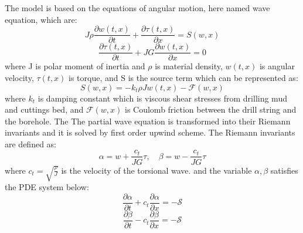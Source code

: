 The model is based on the equations of angular motion, here named wave equation, which are:
\begin{equation}\label{AS-motion}
  J\rho\frac{\partial w(t,x)}{\partial t} + \frac{\partial \tau (t,x)}{\partial x} = S(w,x) 
\end{equation}
\begin{equation}
 \frac{\partial\tau(t,x)}{\partial t} + JG\frac{\partial w(t,x)}{\partial x} = 0 
\end{equation}
where J is polar moment of inertia and $\rho$ is material density, $w(t,x)$ is angular velocity, $\tau(t,x)$ is torque, and S is the source term which can be represented as:
\begin{equation}\label{AS-sourceterm}
  S(w,x) = -k_t \rho J w(t,x) - \mathcal{F}(w,x)
\end{equation}
where $k_t$ is damping constant which is viscous shear stresses from drilling mud and cuttings bed, and $\mathcal{F}(w,x)$ is Coulomb friction between the drill string and the borehole. 
The 
The partial wave equation is transformed into their Riemann invariants and it is solved by first order upwind scheme. The Riemann invariants are defined as:
\begin{equation}\label{AS-Riemann}
  \alpha = w + \frac{c_t}{JG}\tau, \quad \beta=w-\frac{c_t}{JG}\tau
\end{equation}
where $c_t = \sqrt{\frac{\rho}{J}}$ is the velocity of the torsional wave. and the variable $\alpha, \beta$ satisfies the PDE system below:
\begin{equation}\label{AS-Riemann_alpha}
  \frac{\partial \alpha}{\partial t} + c_t\frac{\partial \alpha}{\partial x} = -\mathcal{S}
\end{equation}
\begin{equation}\label{AS-Riemann_beta}
  \frac{\partial \beta}{\partial t} - c_t\frac{\partial \beta}{\partial x} = -\mathcal{S}
\end{equation}

